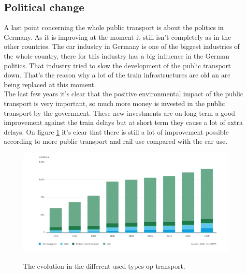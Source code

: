 \subsection{Political change}\label{politicalChange}
A last point concerning the whole public transport is about the politics in Germany. As it is improving at the moment it still isn't completely as in the other countries. The car industry in Germany is one of the biggest industries of the whole country, there for this industry has a big influence in the German politics. That industry tried to slow the development of the public transport down. That's the reason why a lot of the train infrastructures are old an are being replaced at this moment. \\ \newline 
The last few years it's clear that the positive environmental impact of the public transport is very important, so much more money is invested in the public transport by the government. These new investments are on long term a good improvement against the train delays but at short term they cause a lot of extra delays. On figure \ref{fig:typesOfTransport} it's clear that there is still a lot of improvement possible according to more public transport and rail use compared with the car use. 

\begin{figure}[h!]
	\centering
	\includegraphics[width=0.55\textheight]{ProblemsFigures/typesOfTransportGermany}
	\label{fig:typesOfTransport}
	\caption{The evolution in the different used types op transport.}
	
\end{figure}

